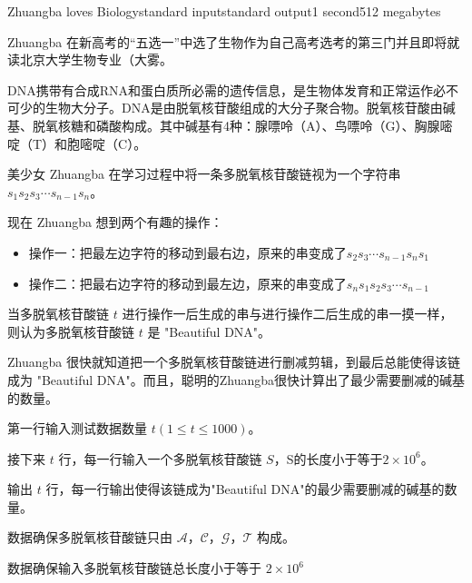 \begin{problem}{Zhuangba loves Biology}{standard input}{standard output}{1 second}{512 megabytes}

Zhuangba 在新高考的“五选一”中选了生物作为自己高考选考的第三门并且即将就读北京大学生物专业（大雾。

DNA携带有合成RNA和蛋白质所必需的遗传信息，是生物体发育和正常运作必不可少的生物大分子。DNA是由脱氧核苷酸组成的大分子聚合物。脱氧核苷酸由碱基、脱氧核糖和磷酸构成。其中碱基有4种：腺嘌呤（A）、鸟嘌呤（G）、胸腺嘧啶（T）和胞嘧啶（C）。

美少女 Zhuangba 在学习过程中将一条多脱氧核苷酸链视为一个字符串 $s_1s_2s_3\cdots s_{n-1}s_n$。

现在 Zhuangba 想到两个有趣的操作：

\begin{itemize}
\item 操作一：把最左边字符的移动到最右边，原来的串变成了$s_2s_3\cdots s_{n-1}s_ns_1$
\item 操作二：把最右边字符的移动到最左边，原来的串变成了$s_ns_1s_2s_3\cdots s_{n-1}$
\end{itemize}

当多脱氧核苷酸链 $t$ 进行操作一后生成的串与进行操作二后生成的串一摸一样，则认为多脱氧核苷酸链 $t$ 是 "Beautiful DNA"。

Zhuangba 很快就知道把一个多脱氧核苷酸链进行删减剪辑，到最后总能使得该链成为 "Beautiful DNA"。而且，聪明的Zhuangba很快计算出了最少需要删减的碱基的数量。

\InputFile

第一行输入测试数据数量 $t(1\le t \le 1000)$。 

接下来 $t$ 行，每一行输入一个多脱氧核苷酸链 $S$，S的长度小于等于$2\times 10^{6}$。


\OutputFile

输出 $t$ 行，每一行输出使得该链成为"Beautiful DNA"的最少需要删减的碱基的数量。

\Example
\begin{example}
%
\end{example}

\Notes

数据确保多脱氧核苷酸链只由 $\mathcal {A，C，G，T}$ 构成。

数据确保输入多脱氧核苷酸链总长度小于等于 $2\times 10^6$

\end{problem}
